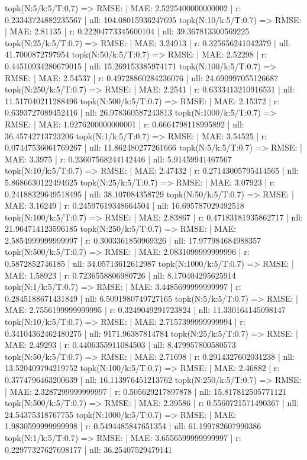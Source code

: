 topk(N:5/k:5/T:0.7) => RMSE: | MAE: 2.5225400000000002 | r: 0.23343724882235567 | nll: 104.08015936247695
topk(N:10/k:5/T:0.7) => RMSE: | MAE: 2.81135 | r: 0.22204773345600104 | nll: 39.367813300569225
topk(N:25/k:5/T:0.7) => RMSE: | MAE: 3.24913 | r: 0.325656241042379 | nll: 41.7000872797954
topk(N:50/k:5/T:0.7) => RMSE: | MAE: 2.52298 | r: 0.44510934280679015 | nll: 15.269153385974171
topk(N:100/k:5/T:0.7) => RMSE: | MAE: 2.54537 | r: 0.49728860284236076 | nll: 24.690997055126687
topk(N:250/k:5/T:0.7) => RMSE: | MAE: 2.2541 | r: 0.6333413210916531 | nll: 11.517040211288496
topk(N:500/k:5/T:0.7) => RMSE: | MAE: 2.15372 | r: 0.6393727089452416 | nll: 26.978360587243813
topk(N:1000/k:5/T:0.7) => RMSE: | MAE: 1.9276200000000001 | r: 0.6664798118995892 | nll: 36.45742713723206
topk(N:1/k:5/T:0.7) => RMSE: | MAE: 3.54525 | r: 0.07447536061769267 | nll: 11.862480277261666
topk(N:5/k:5/T:0.7) => RMSE: | MAE: 3.3975 | r: 0.23607568244142446 | nll: 5.91459941467567
topk(N:10/k:5/T:0.7) => RMSE: | MAE: 2.47432 | r: 0.27143005795414565 | nll: 5.8686630122494625
topk(N:25/k:5/T:0.7) => RMSE: | MAE: 3.07923 | r: 0.24188329649518495 | nll: 38.107084358729
topk(N:50/k:5/T:0.7) => RMSE: | MAE: 3.16249 | r: 0.24597619348664504 | nll: 16.695787029492518
topk(N:100/k:5/T:0.7) => RMSE: | MAE: 2.83867 | r: 0.47183181935862717 | nll: 21.964714123596185
topk(N:250/k:5/T:0.7) => RMSE: | MAE: 2.5854999999999997 | r: 0.3003361850969326 | nll: 17.977984684988357
topk(N:500/k:5/T:0.7) => RMSE: | MAE: 2.0831099999999996 | r: 0.5872852746185 | nll: 34.05713612612987
topk(N:1000/k:5/T:0.7) => RMSE: | MAE: 1.58923 | r: 0.7236558806980726 | nll: 8.170404295625914
topk(N:1/k:5/T:0.7) => RMSE: | MAE: 3.4485699999999997 | r: 0.2845188671431849 | nll: 6.5091980749727165
topk(N:5/k:5/T:0.7) => RMSE: | MAE: 2.7556199999999995 | r: 0.3249049291723824 | nll: 11.330164145098147
topk(N:10/k:5/T:0.7) => RMSE: | MAE: 2.7157399999999994 | r: 0.34104362462480275 | nll: 9171.96387814784
topk(N:25/k:5/T:0.7) => RMSE: | MAE: 2.49293 | r: 0.4406355911084503 | nll: 8.479957800580573
topk(N:50/k:5/T:0.7) => RMSE: | MAE: 2.71698 | r: 0.2914327602031238 | nll: 13.520409794219752
topk(N:100/k:5/T:0.7) => RMSE: | MAE: 2.46882 | r: 0.3774796463200639 | nll: 16.113976451213762
topk(N:250/k:5/T:0.7) => RMSE: | MAE: 2.3287299999999997 | r: 0.505629217897878 | nll: 15.817812505771121
topk(N:500/k:5/T:0.7) => RMSE: | MAE: 2.39586 | r: 0.5560721571490367 | nll: 24.54375318767755
topk(N:1000/k:5/T:0.7) => RMSE: | MAE: 1.9830599999999998 | r: 0.5494485847651354 | nll: 61.199782607990386
topk(N:1/k:5/T:0.7) => RMSE: | MAE: 3.6556599999999997 | r: 0.22977327627698177 | nll: 36.25407529479141
